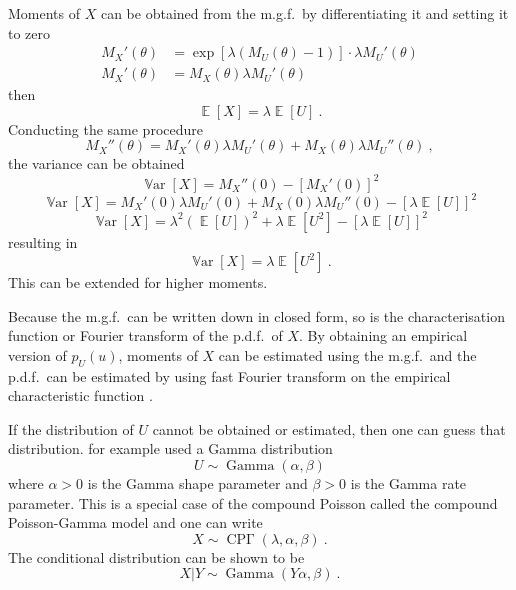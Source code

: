 \documentclass[12pt, a4paper]{memoir}
\DeclareMathOperator{\expectation}{\mathbb{E}}
\DeclareMathOperator{\variance}{\mathbb{V}ar}
\DeclareMathOperator{\gammaDist}{Gamma}
\DeclareMathOperator{\CPoisson}{CP\Gamma}
\begin{document}
Moments of $X$ can be obtained from the m.g.f.~by differentiating it and setting it to zero
\begin{align*}
M_X'(\theta)&=\exp\left[\lambda\left(M_U(\theta)-1\right)\right]\cdot\lambda M_U'(\theta) \\
M_X'(\theta)&=M_X(\theta)\lambda M_U'(\theta)
\end{align*}
then
\begin{equation}
\expectation\left[X\right]=\lambda\expectation\left[U\right] \ .
\end{equation}
Conducting the same procedure
\begin{equation*}
M_X''(\theta)=M_X'(\theta)\lambda M_U'(\theta)+M_X(\theta)\lambda M_U''(\theta) \ ,
\end{equation*}
the variance can be obtained
\begin{equation*}
\variance\left[X\right]=M_X''(0)-\left[M_X'(0)\right]^2
\end{equation*}
\begin{equation*}
\variance\left[X\right]=M_X'(0)\lambda M_U'(0)+M_X(0)\lambda M_U''(0)-\left[\lambda\expectation\left[U\right]\right]^2
\end{equation*}
\begin{equation*}
\variance\left[X\right]=\lambda^2 \left(\expectation\left[U\right]\right)^2+\lambda \expectation\left[U^2\right]-\left[\lambda\expectation\left[U\right]\right]^2
\end{equation*}
resulting in
\begin{equation}
\variance\left[X\right] = \lambda\expectation\left[U^2\right] \ .
\end{equation}
This can be extended for higher moments.

Because the m.g.f.~can be written down in closed form, so is the characterisation function or Fourier transform of the p.d.f.~of $X$. By obtaining an empirical version of $p_U(u)$, moments of $X$ can be estimated using the m.g.f.~and the p.d.f.~can be estimated by using fast Fourier transform on the empirical characteristic function \citep{whiting2006properties}.

If the distribution of $U$ cannot be obtained or estimated, then one can guess that distribution. \cite{xu2009electronic} for example used a Gamma distribution
\begin{equation}
U\sim\gammaDist\left(\alpha,\beta\right)
\end{equation}
where $\alpha>0$ is the Gamma shape parameter and $\beta>0$ is the Gamma rate parameter. This is a special case of the compound Poisson called the compound Poisson-Gamma model and one can write
\begin{equation}
X\sim\CPoisson(\lambda,\alpha,\beta) \ .
\end{equation}
The conditional distribution can be shown to be
\begin{equation}
X|Y\sim\gammaDist\left(Y\alpha,\beta\right) \ .
\end{equation}
\end{document}
